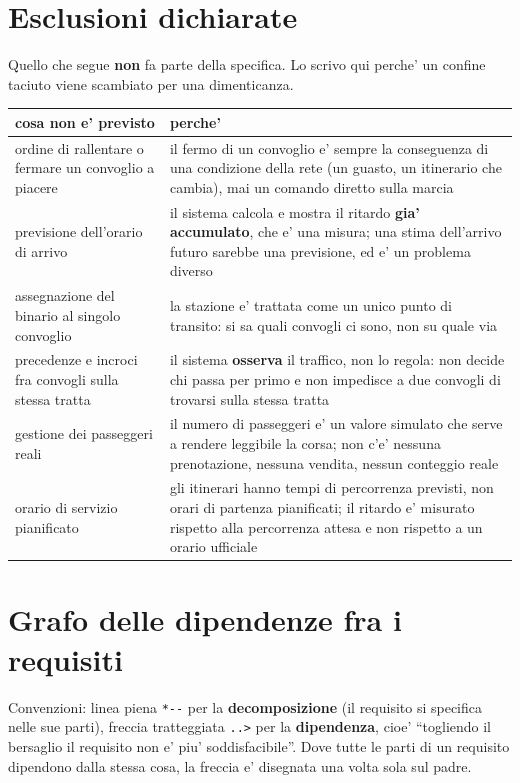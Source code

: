 \documentclass[11pt]{article}
\begin{document}
\section{Esclusioni dichiarate}
\label{sec:orgd450dbd}

Quello che segue \textbf{non} fa parte della specifica. Lo scrivo qui perche' un confine taciuto viene
scambiato per una dimenticanza.

\begin{center}
\begin{tabular}{|p{}|p{}|}
cosa non e' previsto & perche'\\
\hline
ordine di rallentare o fermare un convoglio a piacere & il fermo di un convoglio e' sempre la conseguenza di una condizione della rete (un guasto, un itinerario che cambia), mai un comando diretto sulla marcia\\
previsione dell'orario di arrivo & il sistema calcola e mostra il ritardo \textbf{gia' accumulato}, che e' una misura; una stima dell'arrivo futuro sarebbe una previsione, ed e' un problema diverso\\
assegnazione del binario al singolo convoglio & la stazione e' trattata come un unico punto di transito: si sa quali convogli ci sono, non su quale via\\
precedenze e incroci fra convogli sulla stessa tratta & il sistema \textbf{osserva} il traffico, non lo regola: non decide chi passa per primo e non impedisce a due convogli di trovarsi sulla stessa tratta\\
gestione dei passeggeri reali & il numero di passeggeri e' un valore simulato che serve a rendere leggibile la corsa; non c'e' nessuna prenotazione, nessuna vendita, nessun conteggio reale\\
orario di servizio pianificato & gli itinerari hanno tempi di percorrenza previsti, non orari di partenza pianificati; il ritardo e' misurato rispetto alla percorrenza attesa e non rispetto a un orario ufficiale\\
\end{tabular}
\end{center}
\section{Grafo delle dipendenze fra i requisiti}
\label{sec:org4b92444}

Convenzioni: linea piena \texttt{*-{}-{}} per la \textbf{decomposizione} (il requisito si specifica nelle sue parti),
freccia tratteggiata \texttt{..>} per la \textbf{dipendenza}, cioe' ``togliendo il bersaglio il requisito non e'
piu' soddisfacibile''. Dove tutte le parti di un requisito dipendono dalla stessa cosa, la freccia e'
disegnata una volta sola sul padre.
\end{document}
